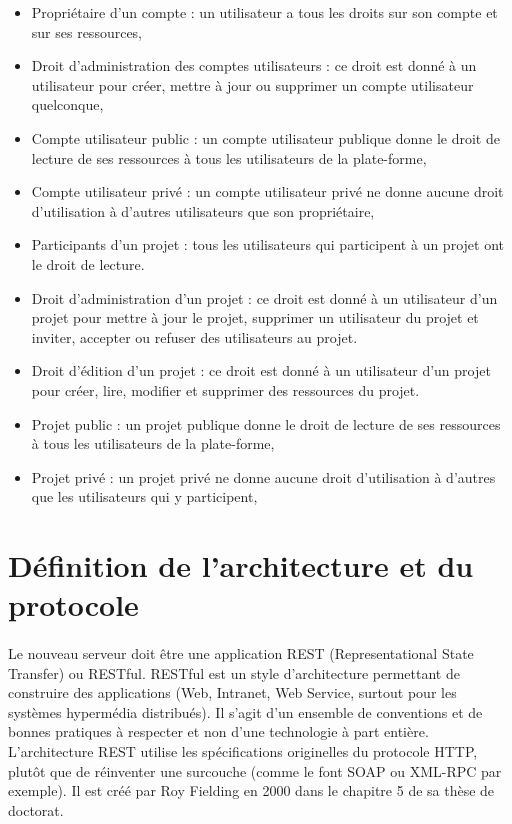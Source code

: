 \documentclass{report}
\begin{document}
\begin{itemize}
\item Propriétaire d'un compte : un utilisateur a tous les droits sur son compte et sur ses ressources,
\item Droit d'administration des comptes utilisateurs : ce droit est donné à un utilisateur pour créer, mettre à jour ou
supprimer un compte utilisateur quelconque,
\item Compte utilisateur public : un compte utilisateur publique donne le droit de lecture de ses ressources à tous les
utilisateurs de la plate-forme,
\item Compte utilisateur privé : un compte utilisateur privé ne donne aucune droit d'utilisation à d'autres utilisateurs que
son propriétaire,
\item Participants d'un projet : tous les utilisateurs qui participent à un projet ont le droit de lecture.
\item Droit d'administration d'un projet : ce droit est donné à un utilisateur d'un projet pour mettre à jour le projet, 
supprimer un utilisateur du projet et inviter, accepter ou refuser des utilisateurs au projet.
\item Droit d'édition d'un projet : ce droit est donné à un utilisateur d'un projet pour créer, lire, modifier et supprimer 
des ressources du projet.
\item Projet public : un projet publique donne le droit de lecture de ses ressources à tous les utilisateurs de la 
plate-forme,
\item Projet privé : un projet privé ne donne aucune droit d'utilisation à d'autres que les utilisateurs qui y
participent,
\end{itemize}






\section{Définition de l'architecture et du protocole}
\paragraph{}
Le nouveau serveur doit être une application REST (Representational State Transfer) ou RESTful. RESTful est un style
d’architecture permettant de construire des applications (Web, Intranet, Web Service, surtout pour les systèmes 
hypermédia distribués). Il s’agit d’un ensemble de conventions et de bonnes pratiques à respecter et non d’une 
technologie à part entière. L’architecture REST utilise les spécifications originelles du protocole HTTP, plutôt que de
réinventer une surcouche (comme le font SOAP ou XML-RPC par exemple). Il est créé par Roy Fielding en 2000 dans le
chapitre 5 de sa thèse de doctorat.
\end{document}
